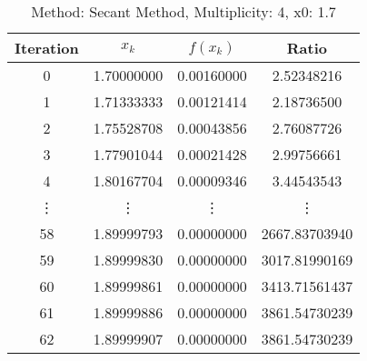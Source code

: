 \begin{table}
\centering
\caption{Method: Secant Method, Multiplicity: 4, x0: 1.7}
\label{tab:table_Secant_Method_4_1_7}
\begin{tabular}{c c c c}
\toprule
Iteration &      $x_k$ &   $f(x_k)$ &         Ratio \\
\midrule
        0 & 1.70000000 & 0.00160000 &    2.52348216 \\
        1 & 1.71333333 & 0.00121414 &    2.18736500 \\
        2 & 1.75528708 & 0.00043856 &    2.76087726 \\
        3 & 1.77901044 & 0.00021428 &    2.99756661 \\
        4 & 1.80167704 & 0.00009346 &    3.44543543 \\
   \vdots &     \vdots &     \vdots &        \vdots \\
       58 & 1.89999793 & 0.00000000 & 2667.83703940 \\
       59 & 1.89999830 & 0.00000000 & 3017.81990169 \\
       60 & 1.89999861 & 0.00000000 & 3413.71561437 \\
       61 & 1.89999886 & 0.00000000 & 3861.54730239 \\
       62 & 1.89999907 & 0.00000000 & 3861.54730239 \\
\bottomrule
\end{tabular}
\end{table}
